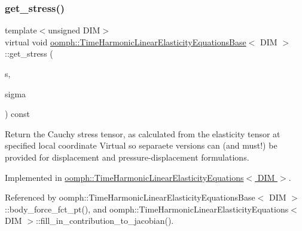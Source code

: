 \subsubsection{\texorpdfstring{get\+\_\+stress()}{get\_stress()}}
{\footnotesize\ttfamily template$<$unsigned D\+IM$>$ \\
virtual void \hyperlink{classoomph_1_1TimeHarmonicLinearElasticityEquationsBase}{oomph\+::\+Time\+Harmonic\+Linear\+Elasticity\+Equations\+Base}$<$ D\+IM $>$\+::get\+\_\+stress (\begin{DoxyParamCaption}\item[{const \hyperlink{classoomph_1_1Vector}{Vector}$<$ double $>$ \&}]{s,  }\item[{\hyperlink{classoomph_1_1DenseMatrix}{Dense\+Matrix}$<$ std\+::complex$<$ double $>$ $>$ \&}]{sigma }\end{DoxyParamCaption}) const\hspace{0.3cm}{\ttfamily [pure virtual]}}



Return the Cauchy stress tensor, as calculated from the elasticity tensor at specified local coordinate Virtual so separaete versions can (and must!) be provided for displacement and pressure-\/displacement formulations. 



Implemented in \hyperlink{classoomph_1_1TimeHarmonicLinearElasticityEquations_a46807604989766db0dd54dd8ff457021}{oomph\+::\+Time\+Harmonic\+Linear\+Elasticity\+Equations$<$ D\+I\+M $>$}.



Referenced by oomph\+::\+Time\+Harmonic\+Linear\+Elasticity\+Equations\+Base$<$ D\+I\+M $>$\+::body\+\_\+force\+\_\+fct\+\_\+pt(), and oomph\+::\+Time\+Harmonic\+Linear\+Elasticity\+Equations$<$ D\+I\+M $>$\+::fill\+\_\+in\+\_\+contribution\+\_\+to\+\_\+jacobian().

\mbox{\label{classoomph_1_1TimeHarmonicLinearElasticityEquationsBase_a3687a170e0ca6065a410710dd5bc71b3}} 
